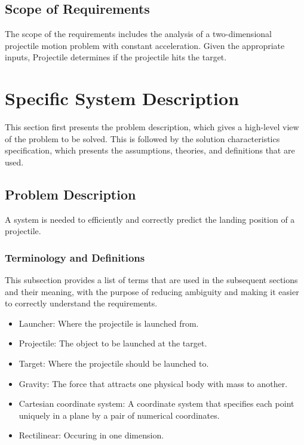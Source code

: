 \documentclass[12pt]{article}
\begin{document}
\subsection{Scope of Requirements}
\label{Sec:ReqsScope}
The scope of the requirements includes the analysis of a two-dimensional projectile motion problem with constant acceleration. Given the appropriate inputs, Projectile determines if the projectile hits the target.
\section{Specific System Description}
\label{Sec:SpecSystDesc}
This section first presents the problem description, which gives a high-level view of the problem to be solved. This is followed by the solution characteristics specification, which presents the assumptions, theories, and definitions that are used.
\subsection{Problem Description}
\label{Sec:ProbDesc}
A system is needed to efficiently and correctly predict the landing position of a projectile.
\subsubsection{Terminology and Definitions}
\label{Sec:TermDefs}
This subsection provides a list of terms that are used in the subsequent sections and their meaning, with the purpose of reducing ambiguity and making it easier to correctly understand the requirements.
\begin{itemize}
\item{Launcher: Where the projectile is launched from.}
\item{Projectile: The object to be launched at the target.}
\item{Target: Where the projectile should be launched to.}
\item{Gravity: The force that attracts one physical body with mass to another.}
\item{Cartesian coordinate system: A coordinate system that specifies each point uniquely in a plane by a pair of numerical coordinates.}
\item{Rectilinear: Occuring in one dimension.}
\end{itemize}
\end{document}
